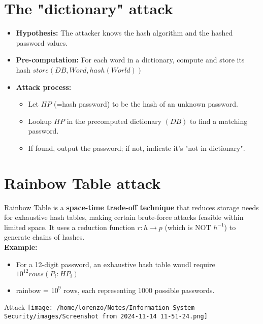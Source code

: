 \section{The "dictionary" attack}
\begin{itemize}
    \item \textbf{Hypothesis:} The attacker knows the hash algorithm and the hashed password values.
    \item \textbf{Pre-computation:} For each word in a dictionary, compute and store its hash \(store(DB,Word,hash(World))\)
    \item \textbf{Attack process:}
    \begin{itemize}
        \item Let \(HP\) (=hash password) to be the hash of an unknown password.
        \item Lookup \(HP\) in the precomputed dictionary \((DB)\) to find a matching password.
        \item If found, output the password; if not, indicate it's "not in dictionary".
    \end{itemize}
\end{itemize}

\section{Rainbow Table attack}
Rainbow Table is a \textbf{space-time trade-off technique} that reduces storage needs for exhaustive hash tables, making certain brute-force attacks feasible within limited space.
It uses a reduction function \(r:h \rightarrow p\) (which is NOT \(h^{-1}\)) to generate chains of hashes.
\\ \textbf{Example:}
\begin{itemize}
    \item For a 12-digit password, an exhaustive hash table woudl require \(10^{12}rows(P_i:HP_i)\) 
    \item rainbow = \(10^9\) rows, each representing 1000 possible passwords.
\end{itemize}

\begin{center}
\begin{minipage}{0.5\textwidth}
    \begin{quotebox}[colframe=blue!10!white, colback=blue!5!white]{Attack}
        \centering
        \texttt{[image: /home/lorenzo/Notes/Information System Security/images/Screenshot from 2024-11-14 11-51-24.png]}
\end{quotebox}
\end{minipage}
\end{center}

